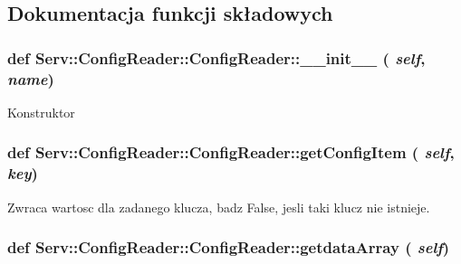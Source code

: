 \subsection{Dokumentacja funkcji składowych}
\hypertarget{class_serv_1_1_config_reader_1_1_config_reader_a79fcc0800606aaab1c5b4b0f2910b821}{
\subsubsection[{\_\-\_\-init\_\-\_\-}]{\setlength{\rightskip}{0pt plus 5cm}def Serv::ConfigReader::ConfigReader::\_\-\_\-init\_\-\_\- ( {\em self}, \/   {\em name})}}
\label{class_serv_1_1_config_reader_1_1_config_reader_a79fcc0800606aaab1c5b4b0f2910b821}
\begin{DoxyVerb}Konstruktor\end{DoxyVerb}
 \hypertarget{class_serv_1_1_config_reader_1_1_config_reader_a9679117d87cde62fd4243670089a11cc}{
\subsubsection[{getConfigItem}]{\setlength{\rightskip}{0pt plus 5cm}def Serv::ConfigReader::ConfigReader::getConfigItem ( {\em self}, \/   {\em key})}}
\label{class_serv_1_1_config_reader_1_1_config_reader_a9679117d87cde62fd4243670089a11cc}
\begin{DoxyVerb}Zwraca wartosc dla zadanego klucza, badz False, jesli taki klucz nie istnieje.\end{DoxyVerb}
 \hypertarget{class_serv_1_1_config_reader_1_1_config_reader_a6a032fedc46e0b5557d1124aeb5fc996}{
\subsubsection[{getdataArray}]{\setlength{\rightskip}{0pt plus 5cm}def Serv::ConfigReader::ConfigReader::getdataArray ( {\em self})}}
\label{class_serv_1_1_config_reader_1_1_config_reader_a6a032fedc46e0b5557d1124aeb5fc996}
